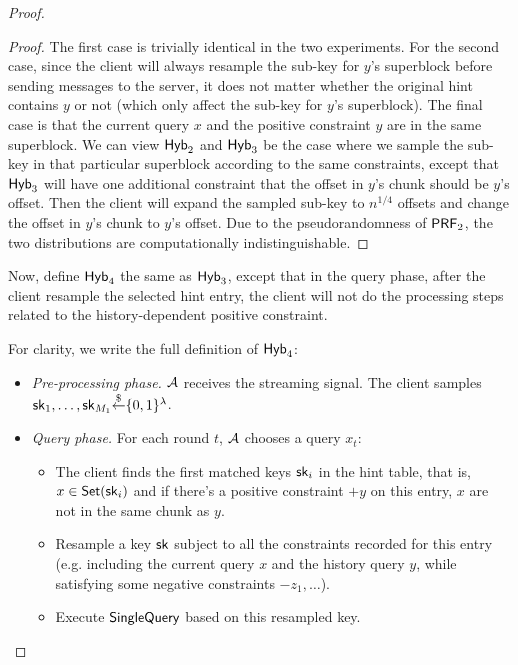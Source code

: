 \begin{proof}
\begin{proof}
    The first case is trivially identical in the two experiments. 
    For the second case, since the client will always resample the sub-key for $y$'s superblock before sending messages to the server, it does not matter whether the original hint contains $y$ or not (which only affect the sub-key for $y$'s superblock).
    The final case is that the current query $x$ and the positive constraint $y$ are in the same superblock.
    We can view ${\sf Hyb}_2$ and ${\sf Hyb}_3$ be the case where we sample the sub-key in that particular superblock according to the same constraints, except that ${\sf Hyb}_3$ will have one additional constraint that the offset in $y$'s chunk should be $y$'s offset.
    Then the client will expand the sampled sub-key to $n^{1/4}$ offsets and change the offset in $y$'s chunk to $y$'s offset.
    Due to the pseudorandomness of $\mathsf{PRF}_2$, the two distributions are computationally indistinguishable.
    
    \end{proof}
    
    Now, define ${\sf Hyb}_4$ the same as ${\sf Hyb}_3$, except that in the query phase, after the client resample the selected hint entry, the client will not do the processing steps related to the history-dependent positive constraint.
    
    For clarity, we write the full definition of ${\sf Hyb}_4$:
    
    \begin{itemize}
        \item \textit{Pre-processing phase.} $\mathcal{A}$ receives the streaming signal. The client samples $\mathsf{sk}_1,\dots,\mathsf{sk}_{M_1}{\overset{\$}{\leftarrow}}\{0,1\}^\lambda$. %
        \item \textit{Query phase.} For each round $t$, $\mathcal{A}$ chooses a query $x_t$:
        \begin{itemize}
            \item The client finds the first matched keys $\mathsf{sk}_i$ in the hint table, that is, $x\in\mathsf{Set}(\mathsf{sk}_i)$ and if there's a positive constraint $+y$ on this entry, $x$ are not in the same chunk as $y$.
            
            \item Resample a key $\mathsf{sk}$ subject to all the constraints recorded for this entry (e.g. including the current query $x$ and the history query $y$, while satisfying some negative constraints $-z_1,\dots$). 
            
            \item Execute $\mathsf{SingleQuery}$ based on this resampled key. 
            

\end{itemize}
\end{itemize}
\end{proof}
